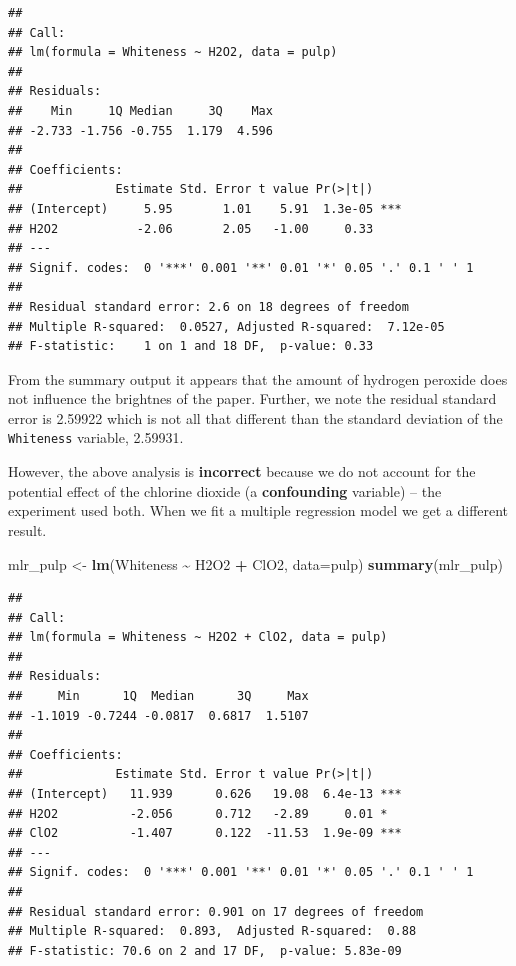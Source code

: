\documentclass[
]{book}
\newenvironment{Shaded}{\begin{snugshade}}{\end{snugshade}}
\newcommand{\AttributeTok}[1]{\textcolor[rgb]{0.13,0.29,0.53}{#1}}
\newcommand{\FunctionTok}[1]{\textcolor[rgb]{0.13,0.29,0.53}{\textbf{#1}}}
\newcommand{\NormalTok}[1]{#1}
\newcommand{\OtherTok}[1]{\textcolor[rgb]{0.56,0.35,0.01}{#1}}
\newcommand{\SpecialCharTok}[1]{\textcolor[rgb]{0.81,0.36,0.00}{\textbf{#1}}}
\begin{document}
\begin{verbatim}
## 
## Call:
## lm(formula = Whiteness ~ H2O2, data = pulp)
## 
## Residuals:
##    Min     1Q Median     3Q    Max 
## -2.733 -1.756 -0.755  1.179  4.596 
## 
## Coefficients:
##             Estimate Std. Error t value Pr(>|t|)    
## (Intercept)     5.95       1.01    5.91  1.3e-05 ***
## H2O2           -2.06       2.05   -1.00     0.33    
## ---
## Signif. codes:  0 '***' 0.001 '**' 0.01 '*' 0.05 '.' 0.1 ' ' 1
## 
## Residual standard error: 2.6 on 18 degrees of freedom
## Multiple R-squared:  0.0527, Adjusted R-squared:  7.12e-05 
## F-statistic:    1 on 1 and 18 DF,  p-value: 0.33
\end{verbatim}

From the summary output it appears that the amount of hydrogen peroxide does not influence the brightnes of the paper.
Further, we note the residual standard error is 2.59922 which is not all that different than the standard deviation of the \texttt{Whiteness} variable, 2.59931.

However, the above analysis is \textbf{incorrect} because we do not account for the potential effect of the chlorine dioxide (a \textbf{confounding} variable) -- the experiment used both.
When we fit a multiple regression model we get a different result.

\begin{Shaded}
\begin{Highlighting}[]
\NormalTok{mlr\_pulp }\OtherTok{\textless{}{-}} \FunctionTok{lm}\NormalTok{(Whiteness }\SpecialCharTok{\textasciitilde{}}\NormalTok{ H2O2 }\SpecialCharTok{+}\NormalTok{ ClO2, }\AttributeTok{data=}\NormalTok{pulp)}
\FunctionTok{summary}\NormalTok{(mlr\_pulp)}
\end{Highlighting}
\end{Shaded}

\begin{verbatim}
## 
## Call:
## lm(formula = Whiteness ~ H2O2 + ClO2, data = pulp)
## 
## Residuals:
##     Min      1Q  Median      3Q     Max 
## -1.1019 -0.7244 -0.0817  0.6817  1.5107 
## 
## Coefficients:
##             Estimate Std. Error t value Pr(>|t|)    
## (Intercept)   11.939      0.626   19.08  6.4e-13 ***
## H2O2          -2.056      0.712   -2.89     0.01 *  
## ClO2          -1.407      0.122  -11.53  1.9e-09 ***
## ---
## Signif. codes:  0 '***' 0.001 '**' 0.01 '*' 0.05 '.' 0.1 ' ' 1
## 
## Residual standard error: 0.901 on 17 degrees of freedom
## Multiple R-squared:  0.893,  Adjusted R-squared:  0.88 
## F-statistic: 70.6 on 2 and 17 DF,  p-value: 5.83e-09
\end{verbatim}
\end{document}
